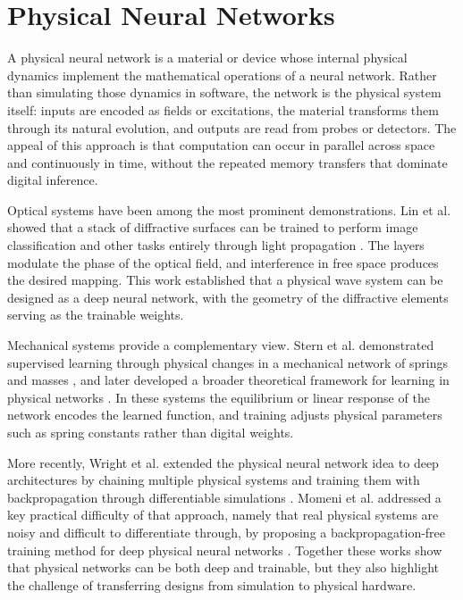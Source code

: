 \section{Physical Neural Networks}
\label{sec:lit_pnn}

A physical neural network is a material or device whose internal physical dynamics implement the mathematical operations of a neural network. Rather than simulating those dynamics in software, the network is the physical system itself: inputs are encoded as fields or excitations, the material transforms them through its natural evolution, and outputs are read from probes or detectors. The appeal of this approach is that computation can occur in parallel across space and continuously in time, without the repeated memory transfers that dominate digital inference.

Optical systems have been among the most prominent demonstrations. Lin et al. showed that a stack of diffractive surfaces can be trained to perform image classification and other tasks entirely through light propagation \cite{lin2018alloptical}. The layers modulate the phase of the optical field, and interference in free space produces the desired mapping. This work established that a physical wave system can be designed as a deep neural network, with the geometry of the diffractive elements serving as the trainable weights.

Mechanical systems provide a complementary view. Stern et al. demonstrated supervised learning through physical changes in a mechanical network of springs and masses \cite{stern2020supervised}, and later developed a broader theoretical framework for learning in physical networks \cite{stern2021physical}. In these systems the equilibrium or linear response of the network encodes the learned function, and training adjusts physical parameters such as spring constants rather than digital weights.

More recently, Wright et al. extended the physical neural network idea to deep architectures by chaining multiple physical systems and training them with backpropagation through differentiable simulations \cite{wright2022deep}. Momeni et al. addressed a key practical difficulty of that approach, namely that real physical systems are noisy and difficult to differentiate through, by proposing a backpropagation-free training method for deep physical neural networks \cite{momeni2023backpropagation}. Together these works show that physical networks can be both deep and trainable, but they also highlight the challenge of transferring designs from simulation to physical hardware.

